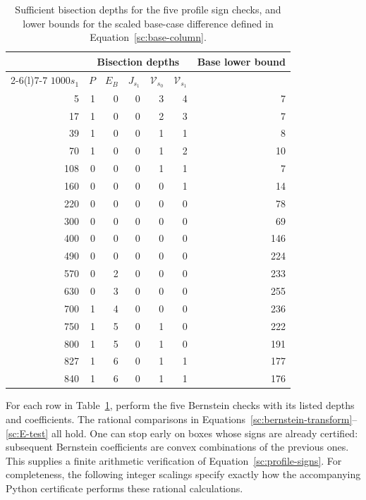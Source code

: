 \begin{table}[htbp]
\centering
\begin{tabular}{rrrrrrr}
\toprule
&\multicolumn{5}{c}{Bisection depths}&Base lower bound\\
\cmidrule(lr){2-6}\cmidrule(l){7-7}
$1000s_1$&$P$&$E_B$&$J_{s_1}$&$\mathcal V_{s_0}$&$\mathcal V_{s_1}$&\\
\midrule
5&1&0&0&3&4&7\\
17&1&0&0&2&3&7\\
39&1&0&0&1&1&8\\
70&1&0&0&1&2&10\\
108&0&0&0&1&1&7\\
160&0&0&0&0&1&14\\
220&0&0&0&0&0&78\\
300&0&0&0&0&0&69\\
400&0&0&0&0&0&146\\
490&0&0&0&0&0&224\\
570&0&2&0&0&0&233\\
630&0&3&0&0&0&255\\
700&1&4&0&0&0&236\\
750&1&5&0&1&0&222\\
800&1&5&0&1&0&191\\
827&1&6&0&1&1&177\\
840&1&6&0&1&1&176\\
\bottomrule
\end{tabular}
\caption{Sufficient bisection depths for the five profile sign checks,
and lower bounds for the scaled base-case difference defined in
Equation~\eqref{sc:base-column}.}\label{sc:tab:profile-depths}
\end{table}

For each row in Table~\ref{sc:tab:profile-depths}, perform the five
Bernstein checks with its listed depths and coefficients.  The rational
comparisons in Equations~\eqref{sc:bernstein-transform}--\eqref{sc:E-test} all hold.
One can stop early on boxes whose signs are already certified: subsequent
Bernstein coefficients are convex combinations of the previous ones.
This supplies a finite arithmetic verification of Equation~\eqref{sc:profile-signs}.
For completeness, the following integer scalings specify exactly how the
accompanying Python certificate performs these rational calculations.

